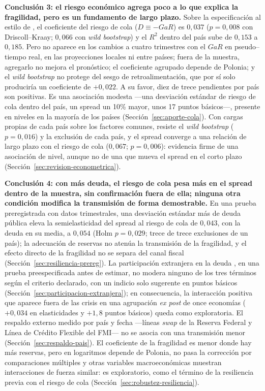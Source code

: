 \textbf{Conclusión 3: el riesgo económico agrega poco a lo que explica la fragilidad, pero es un fundamento de largo plazo.} Sobre la especificación al estilo de \citet{Chari2024b}, el coeficiente del riesgo de cola ($D\equiv-GaR$) es $0{,}037$ ($p=0{,}008$ con Driscoll--Kraay; $0{,}066$ con \textit{wild bootstrap}) y el $R^2$ dentro del país sube de $0{,}153$ a $0{,}185$. Pero no aparece en los cambios a cuatro trimestres con el $GaR$ en pseudo--tiempo real, en las proyecciones locales ni entre países; fuera de la muestra, agregarlo no mejora el pronóstico; el coeficiente agrupado depende de Polonia; y el \textit{wild bootstrap} no protege del sesgo de retroalimentación, que por sí solo produciría un coeficiente de $+0{,}022$. A su favor, diez de trece pendientes por país son positivas. Es una asociación modesta ---una desviación estándar de riesgo de cola dentro del país, un spread un 10\% mayor, unos 17 puntos básicos---, presente en niveles en la mayoría de los países (Sección~\ref{sec:aporte-cola}). Con cargas propias de cada país sobre los factores comunes, resiste el \textit{wild bootstrap} ($p=0{,}016$) y la exclusión de cada país, y el spread converge a una relación de largo plazo con el riesgo de cola ($0{,}067$; $p=0{,}006$): evidencia firme de una asociación de nivel, aunque no de una que mueva el spread en el corto plazo (Sección~\ref{sec:revision-econometrica}).

\textbf{Conclusión 4: con más deuda, el riesgo de cola pesa más en el spread dentro de la muestra, sin confirmación fuera de ella; ninguna otra condición modifica la transmisión de forma demostrable.} En una prueba preregistrada con datos trimestrales, una desviación estándar más de deuda pública eleva la semielasticidad del spread al riesgo de cola de $0{,}043$, con la deuda en su media, a $0{,}054$ (Holm $p=0{,}029$; trece de trece exclusiones de un país); la adecuación de reservas no atenúa la transmisión de la fragilidad, y el efecto directo de la fragilidad no se separa del canal fiscal (Sección~\ref{sec:resiliencia-prereg}). La participación extranjera en la deuda \citep{ArslanalpTsuda2014}, en una prueba preespecificada antes de estimar, no modera ninguno de los tres términos según el criterio declarado, con un indicio solo sugerente en puntos básicos (Sección~\ref{sec:participacion-extranjera}); en consecuencia, la interacción positiva que aparece fuera de las crisis en una agrupación \textit{ex post} de once economías ($+0{,}034$ en elasticidades y $+1{,}8$ puntos básicos) queda como exploratoria. El respaldo externo medido por país y fecha ---líneas \textit{swap} de la Reserva Federal y Línea de Crédito Flexible del FMI--- no se asocia con una transmisión menor (Sección~\ref{sec:respaldo-pais}). El coeficiente de la fragilidad es menor donde hay más reservas, pero en logaritmos depende de Polonia, no pasa la corrección por comparaciones múltiples y otras variables macroeconómicas muestran interacciones de fuerza similar: es exploratorio, como el término de la resiliencia previa con el riesgo de cola (Sección~\ref{sec:robustez-resiliencia}).

